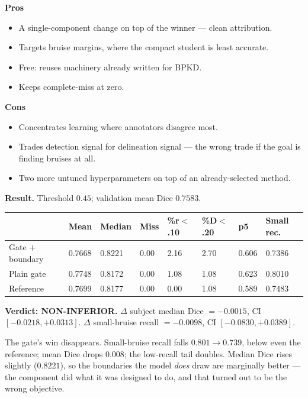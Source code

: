 \documentclass[11pt]{article}
\newcommand{\pro}[1]{\item[\textcolor{proscol}{$+$}] #1}
\newcommand{\con}[1]{\item[\textcolor{conscol}{$-$}] #1}
\begin{document}
\begin{minipage}[t]{0.475\textwidth}
\textbf{\textcolor{proscol}{Pros}}
\begin{itemize}[leftmargin=1.5em,itemsep=1pt,label={},labelwidth=1em,labelsep=0.4em,align=left]
  \pro{A single-component change on top of the winner --- clean attribution.}
  \pro{Targets bruise margins, where the compact student is least accurate.}
  \pro{Free: reuses machinery already written for BPKD.}
  \pro{Keeps complete-miss at zero.}
\end{itemize}
\end{minipage}\hfill%
\begin{minipage}[t]{0.475\textwidth}
\textbf{\textcolor{conscol}{Cons}}
\begin{itemize}[leftmargin=1.5em,itemsep=1pt,label={},labelwidth=1em,labelsep=0.4em,align=left]
  \con{Concentrates learning where annotators disagree most.}
  \con{Trades detection signal for delineation signal --- the wrong trade if the goal is finding
       bruises at all.}
  \con{Two more untuned hyperparameters on top of an already-selected method.}
\end{itemize}
\end{minipage}

\vspace{6pt}
\textbf{Result.} Threshold $0.45$; validation mean Dice $0.7583$.

\begin{center}\small
\begin{tabular}{K q q q q q q M}
\toprule
& \textbf{Mean} & \textbf{Median} & \textbf{Miss} & \textbf{\%r$<$.10} & \textbf{\%D$<$.20} &
\textbf{p5} & \textbf{Small rec.} \\
\midrule
Gate $+$ boundary & 0.7668 & 0.8221 & 0.00 & 2.16 & 2.70 & 0.606 & 0.7386 \\
Plain gate        & 0.7748 & 0.8172 & 0.00 & 1.08 & 1.08 & 0.623 & 0.8010 \\
Reference         & 0.7699 & 0.8177 & 0.00 & 0.00 & 1.08 & 0.589 & 0.7483 \\
\bottomrule
\end{tabular}
\end{center}

\textbf{Verdict: NON-INFERIOR.}
$\Delta$ subject median Dice $=-0.0015$, CI $[-0.0218,+0.0313]$.
$\Delta$ small-bruise recall $=-0.0098$, CI $[-0.0830,+0.0389]$.

The gate's win disappears. Small-bruise recall falls $0.801\to0.739$, below even the reference;
mean Dice drops $0.008$; the low-recall tail doubles. Median Dice rises slightly ($0.8221$), so the
boundaries the model \emph{does} draw are marginally better --- the component did what it was
designed to do, and that turned out to be the wrong objective.
\end{document}
